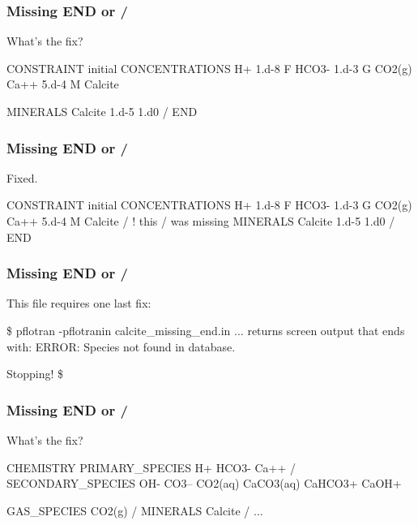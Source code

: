 \documentclass{beamer}
\newcommand\gehcomment[1]{{{\color{orange} #1}}}
\newcommand\redcomment[1]{{{\color{red} #1}}}
\newcommand\bluecomment[1]{{{\color{blue} #1}}}
\newcommand\greencomment[1]{{{\color{green} #1}}}
\begin{document}
\begin{frame}\frametitle{Missing \greencomment{END} or \greencomment{/}}
\redcomment{What's the fix?}
\begin{semiverbatim}

CONSTRAINT initial
  CONCENTRATIONS
    H+     1.d-8      F
    HCO3-  1.d-3      G  CO2(g)
    Ca++   5.d-4      M  Calcite

  MINERALS
    Calcite 1.d-5 1.d0
  /
END
\end{semiverbatim}

\end{frame}

\begin{frame}\frametitle{Missing \greencomment{END} or \greencomment{/}}
\redcomment{Fixed.}
\begin{semiverbatim}

CONSTRAINT initial
  CONCENTRATIONS
    H+     1.d-8      F
    HCO3-  1.d-3      G  CO2(g)
    Ca++   5.d-4      M  Calcite
  / \bluecomment{! this \greencomment{/} was missing}
  MINERALS
    Calcite 1.d-5 1.d0
  /
END
\end{semiverbatim}

\end{frame}

\begin{frame}\frametitle{Missing \greencomment{END} or \greencomment{/}}
\redcomment{This file requires one last fix:}
\begin{semiverbatim}

\$ pflotran -pflotranin calcite_missing_end.in
... \gehcomment{returns screen output that ends with:}
  ERROR: Species not found in database.

  Stopping!
\$
\end{semiverbatim}

\end{frame}

\begin{frame}\frametitle{Missing \greencomment{END} or \greencomment{/}}
\redcomment{What's the fix?}
\begin{semiverbatim}
CHEMISTRY
  PRIMARY_SPECIES
    H+
    HCO3-
    Ca++
  /
  SECONDARY_SPECIES
    OH-
    CO3--
    CO2(aq)
    CaCO3(aq)
    CaHCO3+
    CaOH+

  GAS_SPECIES
    CO2(g)
  /
  MINERALS
    Calcite
  /
...
\end{semiverbatim}

\end{frame}
\end{document}
